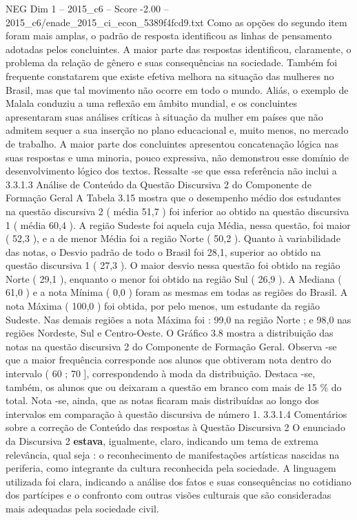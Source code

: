 \begin{textsample}{NEG Dim 1 – 2015\_c6 – Score -2.00 – 2015\_c6/enade\_2015\_ci\_econ\_5389f4fcd9.txt}
Como as opções do segundo item foram mais amplas, o padrão de resposta identificou as linhas de pensamento adotadas pelos concluintes.
A maior parte das respostas identificou, claramente, o problema da relação de gênero e suas consequências na sociedade.
Também foi frequente constatarem que existe efetiva melhora na situação das mulheres no Brasil, mas que tal movimento não ocorre em todo o mundo.
Aliás, o exemplo de Malala conduziu a uma reflexão em âmbito mundial, e os concluintes apresentaram suas análises críticas à situação da mulher em países que não admitem sequer a sua inserção no plano educacional e, muito menos, no mercado de trabalho.
A maior parte dos concluintes apresentou concatenação lógica nas suas respostas e uma minoria, pouco expressiva, não demonstrou esse domínio de desenvolvimento lógico dos textos.
Ressalte -se que essa referência não inclui a 3.3.1.3 Análise de Conteúdo da Questão Discursiva 2 do Componente de Formação Geral A Tabela 3.15 mostra que o desempenho médio dos estudantes na questão discursiva 2 ( média 51,7 ) foi inferior ao obtido na questão discursiva 1 ( média 60,4 ).
A região Sudeste foi aquela cuja Média, nessa questão, foi maior ( 52,3 ), e a de menor Média foi a região Norte ( 50,2 ).
Quanto à variabilidade das notas, o Desvio padrão de todo o Brasil foi 28,1, superior ao obtido na questão discursiva 1 ( 27,3 ).
O maior desvio nessa questão foi obtido na região Norte ( 29,1 ), enquanto o menor foi obtido na região Sul ( 26,9 ).
A Mediana ( 61,0 ) e a nota Mínima ( 0,0 ) foram as mesmas em todas as regiões do Brasil.
A nota Máxima ( 100,0 ) foi obtida, por pelo menos, um estudante da região Sudeste.
Nas demais regiões a nota Máxima foi : 99,0 na região Norte ; e 98,0 nas regiões Nordeste, Sul e Centro-Oeste.
O Gráfico 3.8 mostra a distribuição das notas na questão discursiva 2 do Componente de Formação Geral.
Observa -se que a maior frequência corresponde aos alunos que obtiveram nota dentro do intervalo ( 60 ; 70 ], correspondendo à moda da distribuição.
Destaca -se, também, os alunos que ou deixaram a questão em branco com mais de 15 \% do total.
Nota -se, ainda, que as notas ficaram mais distribuídas ao longo dos intervalos em comparação à questão discursiva de número 1. 3.3.1.4 Comentários sobre a correção de Conteúdo das respostas à Questão Discursiva 2 O enunciado da Discursiva 2 \textbf{estava}, igualmente, claro, indicando um tema de extrema relevância, qual seja : o reconhecimento de manifestações artísticas nascidas na periferia, como integrante da cultura reconhecida pela sociedade.
A linguagem utilizada foi clara, indicando a análise dos fatos e suas consequências no cotidiano dos partícipes e o confronto com outras visões culturais que são consideradas mais adequadas pela sociedade civil.

\end{textsample}
